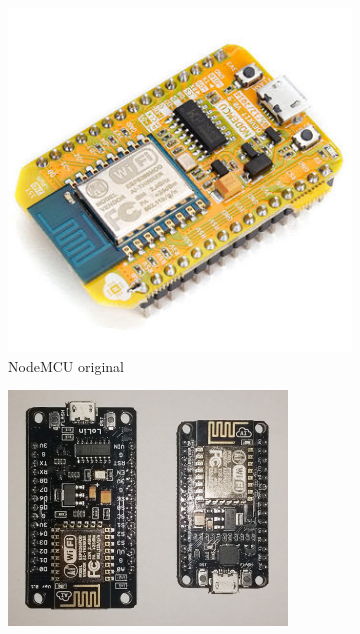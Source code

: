 \documentclass{beamer}
\begin{document}
\begin{frame}
\begin{minipage}{\textwidth}
	\begin{figure}
		\centering
		\begin{subfigure}[b]{0.25\textwidth}
			\includegraphics[width=\textwidth]{NodeMCU09.jpg}
			\caption{NodeMCU original}
			\label{fig:arudfdsidfsdno_uno}
		\end{subfigure}
		\begin{subfigure}[b]{0.25\textwidth}
			\includegraphics[width=\textwidth]{amica-vs-lolin-1.png}

\end{subfigure}
\end{figure}
\end{minipage}
\end{frame}
\end{document}
